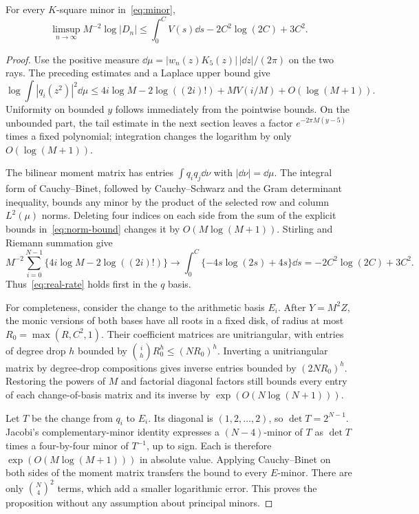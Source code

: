 \begin{proposition}\label{prop:real-rate}
For every $K$-square minor in~\eqref{eq:minor},
\begin{equation}\label{eq:real-rate}
 \limsup_{n\to\infty}M^{-2}\log|D_n|
 \le \int_0^C V(s)\dd s-2C^2\log(2C)+3C^2.
\end{equation}
\end{proposition}
\begin{proof}
Use the positive measure $\dd\mu=|w_n(z)K_5(z)|\,|\dd z|/(2\pi)$
on the two rays.  The preceding estimates and a Laplace upper bound give
\begin{equation}\label{eq:norm-bound}
 \log\int|q_i(z^2)|^2\dd\mu
 \le4i\log M-2\log((2i)!)+MV(i/M)+O(\log(M+1)).
\end{equation}
Uniformity on bounded $y$ follows immediately from the pointwise bounds.
On the unbounded part, the tail estimate in the next section leaves a
factor $e^{-2\pi M(y-5)}$ times a fixed polynomial; integration changes
the logarithm by only $O(\log(M+1))$.

The bilinear moment matrix has entries $\int q_iq_j\dd\nu$ with
$|\dd\nu|=\dd\mu$.  The integral form of Cauchy--Binet, followed by
Cauchy--Schwarz and the Gram determinant inequality, bounds any minor
by the product of the selected row and column $L^2(\mu)$ norms.
Deleting four indices on each side from the sum of the explicit bounds
in~\eqref{eq:norm-bound} changes it by $O(M\log(M+1))$.
Stirling and Riemann summation give
\[
 M^{-2}\sum_{i=0}^{N-1}\{4i\log M-2\log((2i)!)\}
 \longrightarrow\int_0^C\{-4s\log(2s)+4s\}\dd s
 =-2C^2\log(2C)+3C^2.
\]
Thus~\eqref{eq:real-rate} holds first in the $q$ basis.

For completeness, consider the change to the arithmetic basis $E_i$.
After $Y=M^2Z$, the monic versions of both bases have all roots in a
fixed disk, of radius at most $R_0=\max(R,C^2,1)$.
Their coefficient matrices are unitriangular, with entries of degree
drop $h$ bounded by $\binom{i}{h}R_0^h\le(NR_0)^h$.
Inverting a unitriangular matrix by degree-drop compositions gives
inverse entries bounded by $(2NR_0)^h$.  Restoring the powers of $M$
and factorial diagonal factors still bounds every entry of each
change-of-basis matrix and its inverse by $\exp(O(N\log(N+1)))$.

Let $T$ be the change from $q_i$ to $E_i$.  Its diagonal is
$(1,2,\ldots,2)$, so $\det T=2^{N-1}$.  Jacobi's complementary-minor
identity expresses a $(N-4)$-minor of $T$ as $\det T$ times a
four-by-four minor of $T^{-1}$, up to sign.  Each is therefore
$\exp(O(M\log(M+1)))$ in absolute value.  Applying Cauchy--Binet
on both sides of the moment matrix transfers the bound to every
$E$-minor.  There are only $\binom N4^2$ terms, which add a smaller
logarithmic error.  This proves the proposition without any
assumption about principal minors.
\end{proof}


